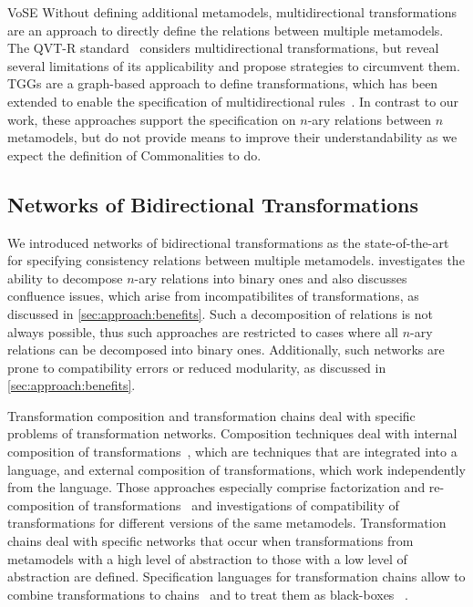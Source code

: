 \begin{copiedFrom}{VoSE}
Without defining additional metamodels, multidirectional transformations are an approach to directly define the relations between multiple metamodels.
The QVT-R standard~\cite{qvt} considers multidirectional transformations, but \textcite{macedo2014FrameworkMultiDirectional-BX} reveal several limitations of its applicability and propose strategies to circumvent them.
\acp{TGG} are a graph-based approach to define transformations, which has been extended to enable the specification of multidirectional rules~\cite{trollmann2015TransformationTGGtoMultiModel-ICMT, trollmann2016SynchronizationTGGtoMultiModel-ICMT}.
In contrast to our work, these approaches support the specification on $n$-ary relations between $n$ metamodels, but do not provide means to improve their understandability as we expect the definition of Commonalities to do.


\subsection*{Networks of Bidirectional Transformations}

We introduced networks of bidirectional transformations as the state-of-the-art for specifying consistency relations between multiple metamodels.
\textcite{stevens2020BidirectionalTransformationLarge-SoSym} investigates the ability to decompose $n$-ary relations into binary ones and also discusses confluence issues, which arise from incompatibilites of transformations, as discussed in \autoref{sec:approach:benefits}.
Such a decomposition of relations is not always possible, thus such approaches are restricted to cases where all $n$-ary relations can be decomposed into binary ones.
Additionally, such networks are prone to compatibility errors or reduced modularity, as discussed in \autoref{sec:approach:benefits}.

Transformation composition and transformation chains deal with specific problems of transformation networks.
Composition techniques deal with internal composition of transformations~\cite{wagelaar2008a}, which are techniques that are integrated into a language, and external composition of transformations, which work independently from the language.
Those approaches especially comprise factorization and re-composition of transformations~\cite{cuadrado2008a} and investigations of compatibility of transformations for different versions of the same metamodels.
Transformation chains deal with specific networks that occur when transformations from metamodels with a high level of abstraction to those with a low level of abstraction are defined.
Specification languages for transformation chains %
allow to combine transformations to chains~\cite{lucio2013FTGPM-SDL} and to treat them as black-boxes%
~\cite{vanhooff2006a, vanhooff2007UniTI-MODELS}. 



\end{copiedFrom}
